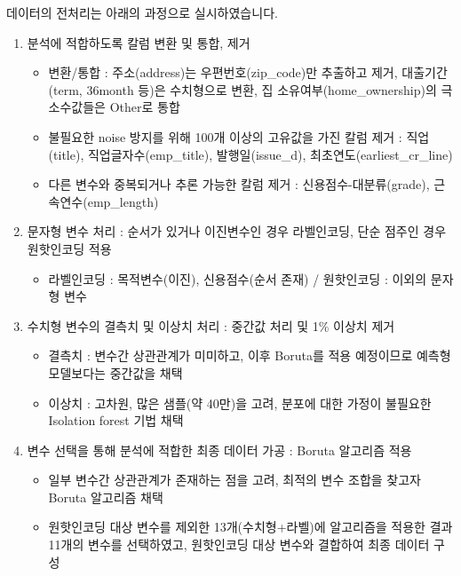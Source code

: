 \documentclass[
  a4paper,
  DIV=11,
  numbers=noendperiod]{scrreprt}
\providecommand{\tightlist}{%
  \setlength{\itemsep}{0pt}\setlength{\parskip}{0pt}}\usepackage{longtable,booktabs,array}
\begin{document}

데이터의 전처리는 아래의 과정으로 실시하였습니다.

\begin{enumerate}
\def\labelenumi{\arabic{enumi}.}
\tightlist
\item
  분석에 적합하도록 칼럼 변환 및 통합, 제거

  \begin{itemize}
  \tightlist
  \item
    변환/통합 : 주소(address)는 우편번호(zip\_code)만 추출하고 제거,
    대출기간(term, 36month 등)은 수치형으로 변환, 집
    소유여부(home\_ownership)의 극소수값들은 Other로 통합
  \item
    불필요한 noise 방지를 위해 100개 이상의 고유값을 가진 칼럼 제거 :
    직업(title), 직업글자수(emp\_title), 발행일(issue\_d),
    최초연도(earliest\_cr\_line)
  \item
    다른 변수와 중복되거나 추론 가능한 칼럼 제거 :
    신용점수-대분류(grade), 근속연수(emp\_length)
  \end{itemize}
\item
  문자형 변수 처리 : 순서가 있거나 이진변수인 경우 라벨인코딩, 단순
  점주인 경우 원핫인코딩 적용

  \begin{itemize}
  \tightlist
  \item
    라벨인코딩 : 목적변수(이진), 신용점수(순서 존재) / 원핫인코딩 :
    이외의 문자형 변수
  \end{itemize}
\item
  수치형 변수의 결측치 및 이상치 처리 : 중간값 처리 및 1\% 이상치 제거

  \begin{itemize}
  \tightlist
  \item
    결측치 : 변수간 상관관계가 미미하고, 이후 Boruta를 적용 예정이므로
    예측형 모델보다는 중간값을 채택
  \item
    이상치 : 고차원, 많은 샘플(약 40만)을 고려, 분포에 대한 가정이
    불필요한 Isolation forest 기법 채택
  \end{itemize}
\item
  변수 선택을 통해 분석에 적합한 최종 데이터 가공 : Boruta 알고리즘 적용

  \begin{itemize}
  \tightlist
  \item
    일부 변수간 상관관계가 존재하는 점을 고려, 최적의 변수 조합을 찾고자
    Boruta 알고리즘 채택
  \item
    원핫인코딩 대상 변수를 제외한 13개(수치형+라벨)에 알고리즘을 적용한
    결과 11개의 변수를 선택하였고, 원핫인코딩 대상 변수와 결합하여 최종
    데이터 구성
  \end{itemize}
\end{enumerate}
\end{document}
